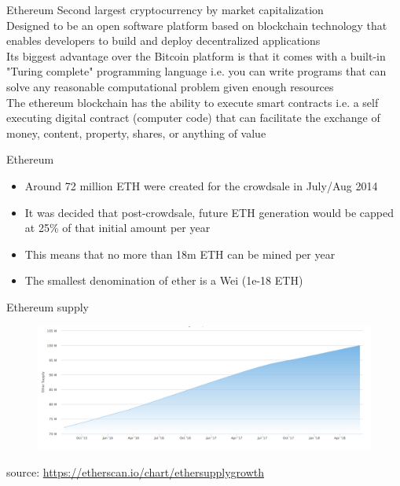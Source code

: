 \documentclass[10pt]{beamer}
\begin{document}

\begin{frame}{Ethereum}
	Second largest cryptocurrency by market capitalization \\ \vspace{3mm}
	Designed to be an open software platform based on blockchain technology that enables developers to build and deploy decentralized applications\\ \vspace{3mm}
	Its biggest advantage over the Bitcoin platform is that it comes with a built-in "Turing complete" programming language i.e. you can write programs that can solve any reasonable computational problem given enough resources\\ \vspace{3mm}
	The ethereum blockchain has the ability to execute smart contracts i.e. a self executing digital contract (computer code) that can facilitate the exchange of money, content, property, shares, or anything of value
\end{frame}


\begin{frame}{Ethereum}
	\begin{itemize}
		\item Around 72 million ETH were created for the crowdsale in July/Aug 2014
		\item It was decided that post-crowdsale, future ETH generation would be capped at 25\% of that initial amount per year
		\item This means that no more than 18m ETH can be mined per year
		\item The smallest denomination of ether is a Wei (1e-18 ETH)
	\end{itemize}
\end{frame}


\begin{frame}{Ethereum supply}
	\begin{figure}[]
		\centering
		\includegraphics  [scale=0.25]{Images/eth-supply}
	\end{figure}
	\begin{scriptsize}
		source: \href{https://etherscan.io/chart/ethersupplygrowth}{https://etherscan.io/chart/ethersupplygrowth}
	\end{scriptsize}
\end{frame}
\end{document}
